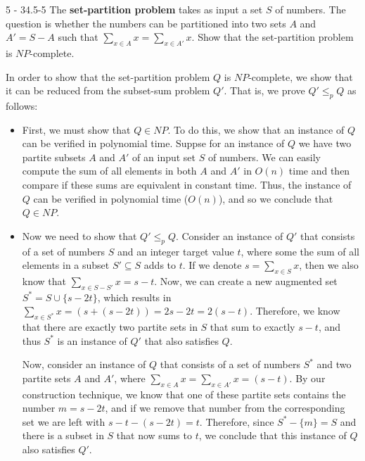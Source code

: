 \documentclass[11pt]{article}
\begin{document}
\begin{prob}{5 - 34.5-5}
The \textbf{set-partition problem} takes as input a set $S$ of numbers. The question is whether the numbers can be partitioned into two sets $A$ and $A' = S - A$ such that $\sum_{x \in A}x = \sum_{x \in A'} x$. Show that the set-partition problem is $NP$-complete.
\end{prob}
\begin{sol}
In order to show that the set-partition problem $Q$ is $NP$-complete, we show that it can be reduced from the subset-sum problem $Q'$. That is, we prove $Q' \leq_p Q$ as follows:


\begin{itemize}
	\item First, we must show that $Q \in NP$. To do this, we show that an instance of $Q$ can be verified in polynomial time. Suppse for an instance of $Q$ we have two partite subsets $A$ and $A'$ of an input set $S$ of numbers. We can easily compute the sum of all elements in both $A$ and $A'$ in $O(n)$ time and then compare if these sums are equivalent in constant time. Thus, the instance of $Q$ can be verified in polynomial time ($O(n)$), and so we conclude that $Q \in NP$. 

	\item Now we need to show that $Q' \leq_p Q$. Consider an instance of $Q'$ that consists of a set of numbers $S$ and an integer target value $t$, where some the sum of all elements in a subset $S' \subseteq S$ adds to $t$. If we denote $s = \sum_{x \in S}x$, then we also know that $\sum_{x \in S - S'}x  = s - t$. Now, we can create a new augmented set $S^* = S \cup \{s - 2t\}$, which results in $\sum_{x \in S^*}x = (s + (s - 2t)) = 2s - 2t = 2(s - t)$. Therefore, we know that there are exactly two partite sets in $S$ that sum to exactly $s - t$, and thus $S^*$ is an instance of $Q'$ that also satisfies $Q$. 

Now, consider an instance of $Q$ that consists of a set of numbers $S^*$ and two partite sets $A$ and $A'$, where $\sum_{x \in A}x = \sum_{x \in A'}x = (s - t)$. By our construction technique, we know that one of these partite sets contains the number $m = s - 2t$, and if we remove that number from the corresponding set we are left with $s - t - (s - 2t) = t$. Therefore, since $S^* - \{m\} = S$ and there is a subset in $S$ that now sums to $t$, we conclude that this instance of $Q$ also satisfies $Q'$.


\end{itemize}
\end{sol}
\end{document}
